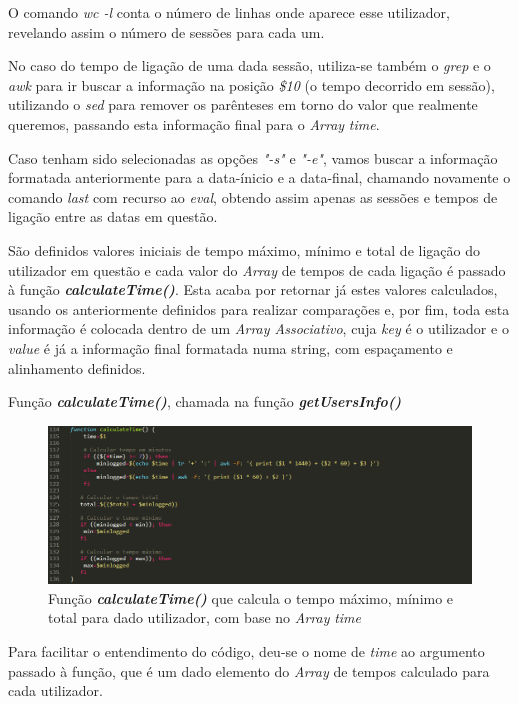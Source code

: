 \documentclass[10pt,portuguese]{article}
\begin{document}
\par O comando \textit{wc -l} conta o número de linhas onde aparece esse utilizador, revelando assim o número de sessões para cada um.
\par No caso do tempo de ligação de uma dada sessão, utiliza-se também o \textit{grep} e o \textit{awk} para ir buscar a informação na posição \textit{\$10} (o tempo decorrido em sessão), utilizando o \textit{sed} para remover os parênteses em torno do valor que realmente queremos, passando esta informação final para o \textit{Array} \textit{time}.
\par Caso tenham sido selecionadas as opções \textit{"-s"} e \textit{"-e"}, vamos buscar a informação formatada anteriormente para a data-ínicio e a data-final, chamando novamente o comando \textit{last} com recurso ao \textit{eval}, obtendo assim apenas as sessões e tempos de ligação entre as datas em questão.
\par São definidos valores iniciais de tempo máximo, mínimo e total de ligação do utilizador em questão e cada valor do \textit{Array} de tempos de cada ligação é passado à função \textbf{\textit{calculateTime()}}. Esta acaba por retornar já estes valores calculados, usando os anteriormente definidos para realizar comparações e, por fim, toda esta informação é colocada dentro de um \textit{Array Associativo}, cuja \textit{key} é o utilizador e o \textit{value} é já a informação final formatada numa string, com espaçamento e alinhamento definidos.
\newpage
\par Função \textbf{\textit{calculateTime()}}, chamada na função \textbf{\textit{getUsersInfo()}} 
\begin{figure}[!h]
    \centering
    \includegraphics[width=\textwidth]{calculateTime.png}
    \caption{Função \textbf{\textit{calculateTime()}} que calcula o tempo máximo, mínimo e total para dado utilizador, com base no \textit{Array} \textit{time}}
\end{figure}
\par Para facilitar o entendimento do código, deu-se o nome de \textit{time} ao argumento passado à função, que é um dado elemento do \textit{Array} de tempos calculado para cada utilizador.
\end{document}
